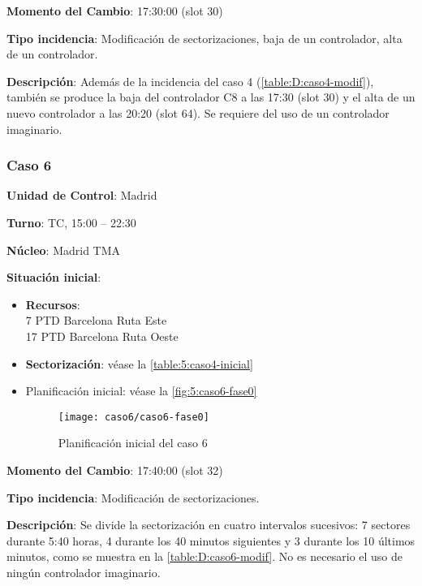 \textbf{Momento del Cambio}: 17:30:00 (slot 30)

\textbf{Tipo incidencia}: Modificación de sectorizaciones, baja de un controlador, alta de un controlador.

\textbf{Descripción}: Además de la incidencia del caso 4 (\autoref{table:D:caso4-modif}), también se produce la baja del controlador C8 a las 17:30 (slot 30) y el alta de un nuevo controlador a las 20:20 (slot 64). Se requiere del uso de un controlador imaginario.

\subsubsection{Caso 6}

\textbf{Unidad de Control}: Madrid

\textbf{Turno}: TC, 15:00 -- 22:30

\textbf{Núcleo}: Madrid TMA

\textbf{Situación inicial}:
\begin{itemize}[label={}]
	
	\item \textbf{Recursos}: \\
	7 PTD Barcelona Ruta Este \\
	17 PTD Barcelona Ruta Oeste
	
	
	\item \textbf{Sectorización}: véase la \autoref{table:5:caso4-inicial}
	
	\item Planificación inicial: véase la \autoref{fig:5:caso6-fase0}
	
	\begin{figure}[!h]
		\centering
		\texttt{[image: caso6/caso6-fase0]}
		\caption{Planificación inicial del caso 6}
		\label{fig:5:caso6-fase0}
	\end{figure}
	
	
\end{itemize}

\textbf{Momento del Cambio}: 17:40:00 (slot 32)

\textbf{Tipo incidencia}: Modificación de sectorizaciones.

\textbf{Descripción}: Se divide la sectorización en cuatro intervalos sucesivos: 7 sectores durante 5:40 horas, 4 durante los 40 minutos siguientes y 3 durante los 10 últimos minutos, como se muestra en la \autoref{table:D:caso6-modif}. No es necesario el uso de ningún controlador imaginario.

